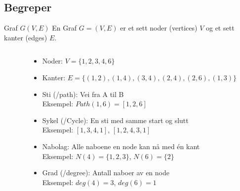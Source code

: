 \subsection*{Begreper}
\begin{frame}
    \begin{block}{Graf $G(V,E)$}
    En Graf $G = (V, E)$ er et sett noder (vertices) $V$ og et sett kanter (edges) $E$.
    \end{block}
    \pause

\begin{columns}
    \begin{column}{0.28\textwidth}
 \end{column}
 \pause
    \begin{column}{0.68\textwidth}
\begin{itemize}[<+->]
    \item Noder: $V=\{1,2,3,4,6\}$ \pause
    \item Kanter: $E=\{(1,2), (1,4), (3,4), (2,4), (2,6), (1,3)\}$\pause
    \item Sti (/path): Vei fra A til B\\
    Eksempel: $Path(1,6)=[1,2,6]$\pause
    \item Sykel (/Cycle): En sti med samme start og slutt\\
    Eksempel: $[1,3,4,1]$, $[1,2,4,3,1]$\pause
    \item Nabolag: Alle naboene en node kan nå med én kant\\
    Eksempel: $N(4)=\{1,2,3\}$, $N(6)=\{2\}$\pause
    \item Grad (/degree): Antall naboer av en node\\
    Eksempel: $deg(4)=3$, $deg(6)=1$
\end{itemize}
 \end{column}
\end{columns}
\end{frame}

